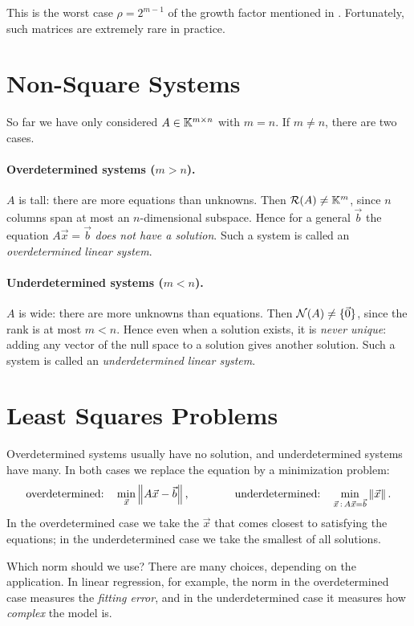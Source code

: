 This is the worst case $\rho = 2^{m-1}$ of the growth factor mentioned in . Fortunately, such matrices are extremely rare in practice.

\section{Non-Square Systems}

So far we have only considered $A \in \mathbb{K}^{m \times n}$ with $m = n$. If $m \ne n$, there are two cases.

\paragraph{Overdetermined systems ($m > n$).} $A$ is tall: there are more equations than unknowns. Then $\mathcal{R}(A) \ne \mathbb{K}^m$, since $n$ columns span at most an $n$-dimensional subspace. Hence for a general $\vec{b}$ the equation $A\vec{x} = \vec{b}$ \emph{does not have a solution}. Such a system is called an \emph{overdetermined linear system}.

\paragraph{Underdetermined systems ($m < n$).} $A$ is wide: there are more unknowns than equations. Then $\mathcal{N}(A) \ne \{\vec{0}\}$, since the rank is at most $m < n$. Hence even when a solution exists, it is \emph{never unique}: adding any vector of the null space to a solution gives another solution. Such a system is called an \emph{underdetermined linear system}.

\section{Least Squares Problems}

Overdetermined systems usually have no solution, and underdetermined systems have many. In both cases we replace the equation by a minimization problem:
\begin{equation}
  \text{overdetermined:}\quad \min_{\vec{x}} \left\lVert A\vec{x} - \vec{b} \right\rVert, \qquad\qquad \text{underdetermined:}\quad \min_{\vec{x} \,:\, A\vec{x} = \vec{b}} \left\lVert \vec{x} \right\rVert.
\end{equation}
In the overdetermined case we take the $\vec{x}$ that comes closest to satisfying the equations; in the underdetermined case we take the smallest of all solutions.

Which norm should we use? There are many choices, depending on the application. In linear regression, for example, the norm in the overdetermined case measures the \emph{fitting error}, and in the underdetermined case it measures how \emph{complex} the model is.

